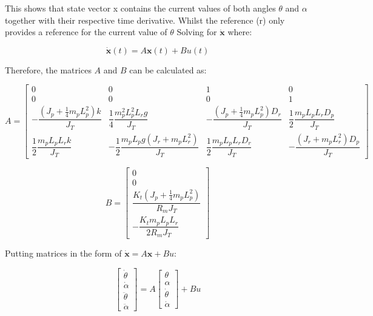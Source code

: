 \documentclass[12pt]{article}
\begin{document}
This shows that state vector x contains the current values of both angles $\theta$ and $\alpha$ together with their respective time derivative. Whilst the reference (r) only provides a reference for the current value of $\theta$
Solving for \(\dot{\mathbf{x}}\) where:

\begin{equation} \label{eq:state_space_form}
\dot{\mathbf{x}}(t) = A \mathbf{x}(t) + B u(t)
\end{equation}

Therefore, the matrices \(A\) and \(B\) can be calculated as:

\begin{equation} \label{eq:A_matrix}
A =
\begin{bmatrix}
0 & 0 & 1 & 0 \\
0 & 0 & 0 & 1 \\
- \dfrac{\left( J_p + \frac{1}{4} m_p L_p^2 \right) k}{J_T} & \dfrac{1}{4} \dfrac{m_p^2 L_p^2 L_r g}{J_T} & - \dfrac{\left( J_p + \frac{1}{4} m_p L_p^2 \right) D_r}{J_T} & \dfrac{1}{2} \dfrac{m_p L_p L_r D_p}{J_T} \\
\dfrac{1}{2} \dfrac{m_p L_p L_r k}{J_T} & - \dfrac{1}{2} \dfrac{m_p L_p g \left( J_r + m_p L_r^2 \right)}{J_T} & \dfrac{1}{2} \dfrac{m_p L_p L_r D_r}{J_T} & - \dfrac{\left( J_r + m_p L_r^2 \right) D_p}{J_T}
\end{bmatrix}
\end{equation}


\begin{equation} \label{eq:B_matrix}
B =
\begin{bmatrix}
0 \\
0 \\
\dfrac{K_t \left(J_p + \frac{1}{4} m_p L_p^2 \right)}{R_m J_T } \\
-\dfrac{K_t m_p L_p L_r}{2 R_m J_T }
\end{bmatrix}
\end{equation}

Putting matrices in the form of \(\dot{\mathbf{x}} = A \mathbf{x} + B u\):

\begin{equation} \label{eq:state_space_expanded}
\begin{bmatrix}
\dot{\theta} \\
\dot{\alpha} \\
\ddot{\theta} \\
\ddot{\alpha}
\end{bmatrix}
=
A
\begin{bmatrix}
\theta \\
\alpha \\
\dot{\theta} \\
\dot{\alpha}
\end{bmatrix}
+
B u
\end{equation}
\end{document}
